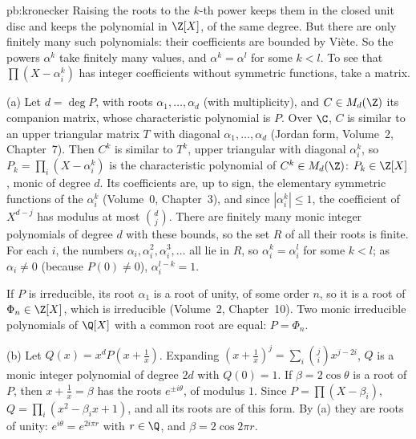 \begin{solution}{pb:kronecker}
\idea Raising the roots to the $k$-th power keeps them in the closed unit disc and keeps the polynomial in $\Z[X]$, of the
same degree. But there are only finitely many such polynomials: their coefficients are bounded by Viète. So the powers
$\alpha^k$ take finitely many values, and $\alpha^k=\alpha^l$ for some $k<l$. To see that $\prod(X-\alpha_i^k)$ has integer
coefficients without symmetric functions, take a matrix.

\writeup (a) Let $d=\deg P$, with roots $\alpha_1,\dots,\alpha_d$ (with multiplicity), and $C\in M_d(\Z)$ its companion
matrix, whose characteristic polynomial is $P$. Over $\C$, $C$ is similar to an upper triangular matrix $T$ with diagonal
$\alpha_1,\dots,\alpha_d$ (Jordan form, Volume~2, Chapter~7). Then $C^k$ is similar to $T^k$, upper triangular with diagonal
$\alpha_i^k$, so $P_k=\prod_i(X-\alpha_i^k)$ is the characteristic polynomial of $C^k\in M_d(\Z)$: $P_k\in\Z[X]$, monic of degree
$d$. Its coefficients are, up to sign, the elementary symmetric functions of the $\alpha_i^k$ (Volume~0, Chapter~3), and since
$|\alpha_i^k|\le1$, the coefficient of $X^{d-j}$ has modulus at most $\binom dj$. There are finitely many monic integer
polynomials of degree $d$ with these bounds, so the set $R$ of all their roots is finite. For each $i$, the numbers
$\alpha_i,\alpha_i^2,\alpha_i^3,\dots$ all lie in $R$, so $\alpha_i^k=\alpha_i^l$ for some $k<l$; as $\alpha_i\ne0$ (because
$P(0)\ne0$), $\alpha_i^{l-k}=1$.

If $P$ is irreducible, its root $\alpha_1$ is a root of unity, of some order $n$, so it is a root of $\Phi_n\in\Z[X]$, which is
irreducible (Volume~2, Chapter~10). Two monic irreducible polynomials of $\Q[X]$ with a common root are equal: $P=\Phi_n$.

(b) Let $Q(x)=x^dP(x+\frac1x)$. Expanding $(x+\frac1x)^j=\sum_i\binom jix^{j-2i}$, $Q$ is a monic integer polynomial of
degree $2d$ with $Q(0)=1$. If $\beta=2\cos\theta$ is a root of $P$, then $x+\frac1x=\beta$ has the roots $e^{\pm i\theta}$, of
modulus $1$. Since $P=\prod(X-\beta_i)$, $Q=\prod_i(x^2-\beta_ix+1)$, and all its roots are of this form. By (a) they are
roots of unity: $e^{i\theta}=e^{2i\pi r}$ with $r\in\Q$, and $\beta=2\cos2\pi r$.


\end{solution}
